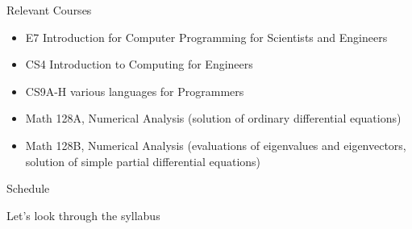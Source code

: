 \documentclass[xcolor=x11names,compress]{beamer}
\renewcommand{\(}{\begin{columns}}
\renewcommand{\)}{\end{columns}}
\newcommand{\<}[1]{\begin{column}{#1}}
\renewcommand{\>}{\end{column}}
\begin{document}

\begin{frame}{Relevant Courses}
\begin{itemize}
\item E7 Introduction for Computer Programming for Scientists and Engineers
\item CS4 Introduction to Computing for Engineers
\item CS9A-H various languages for Programmers
\item Math 128A, Numerical Analysis (solution of ordinary differential equations)
\item Math 128B, Numerical Analysis (evaluations of eigenvalues and eigenvectors, solution of simple partial differential equations)
\end{itemize}
\end{frame}

\begin{frame}{Schedule}

Let's look through the syllabus

\end{frame}
\end{document}
